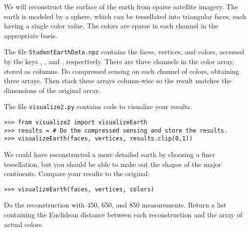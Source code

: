 \begin{problem} %
We will reconstruct the surface of the earth from sparse satellite imagery. The earth is modeled by a sphere, which can be tessellated into triangular faces, each having a single color value.
The colors are sparse in each channel in the appropriate basis. 

The file \texttt{StudentEarthData.npz} contains the faces, vertices, and colors, %
accessed by the keys , , and , %
respectively.
There are three channels in the color array, stored as columns.
Do compressed sensing on each channel of colors, obtaining three arrays.
Then stack these arrays column-wise so the result matches the dimensions of the original array.

The file \texttt{visualize2.py} contains code to visualize your results.
\begin{lstlisting}
>>> from visualize2 import visualizeEarth
>>> results = # Do the compressed sensing and store the results.
>>> visualizeEarth(faces, vertices, results.clip(0,1))
\end{lstlisting}

We could have reconstructed a more detailed earth by choosing a finer tessellation, but you should be able to make out the shapes of the major continents.
Compare your results to the original:
\begin{lstlisting}
>>> visualizeEarth(faces, vertices, colors)
\end{lstlisting}

Do the reconstruction with 450, 650, and 850 measurements.
Return a list containing the Euclidean distance between each reconstruction and the array of actual colors.
\end{problem}